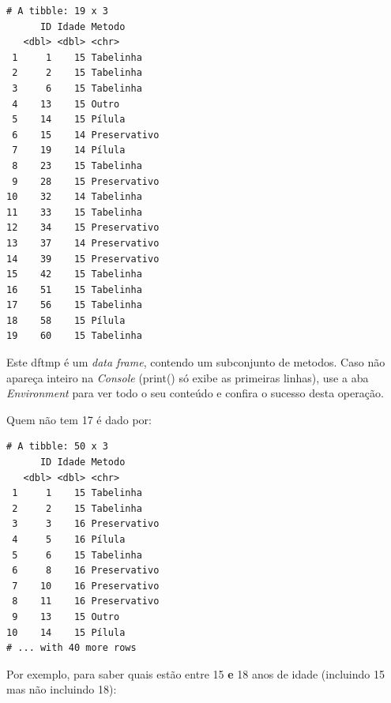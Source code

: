 \documentclass[
]{article}
\newenvironment{Shaded}{\begin{snugshade}}{\end{snugshade}}
\newcommand{\DecValTok}[1]{\textcolor[rgb]{0.00,0.00,0.81}{#1}}
\newcommand{\FunctionTok}[1]{\textcolor[rgb]{0.00,0.00,0.00}{#1}}
\newcommand{\NormalTok}[1]{#1}
\newcommand{\OtherTok}[1]{\textcolor[rgb]{0.56,0.35,0.01}{#1}}
\newcommand{\SpecialCharTok}[1]{\textcolor[rgb]{0.00,0.00,0.00}{#1}}
\begin{document}
\begin{verbatim}
# A tibble: 19 x 3
      ID Idade Metodo      
   <dbl> <dbl> <chr>       
 1     1    15 Tabelinha   
 2     2    15 Tabelinha   
 3     6    15 Tabelinha   
 4    13    15 Outro       
 5    14    15 Pílula      
 6    15    14 Preservativo
 7    19    14 Pílula      
 8    23    15 Tabelinha   
 9    28    15 Preservativo
10    32    14 Tabelinha   
11    33    15 Tabelinha   
12    34    15 Preservativo
13    37    14 Preservativo
14    39    15 Preservativo
15    42    15 Tabelinha   
16    51    15 Tabelinha   
17    56    15 Tabelinha   
18    58    15 Pílula      
19    60    15 Tabelinha   
\end{verbatim}

Este dftmp é um \emph{data frame}, contendo um subconjunto de metodos.
Caso não apareça inteiro na \emph{Console} (print() só exibe as
primeiras linhas), use a aba \emph{Environment} para ver todo o seu
conteúdo e confira o sucesso desta operação.

Quem não tem 17 é dado por:

\begin{Shaded}
\end{Shaded}

\begin{verbatim}
# A tibble: 50 x 3
      ID Idade Metodo      
   <dbl> <dbl> <chr>       
 1     1    15 Tabelinha   
 2     2    15 Tabelinha   
 3     3    16 Preservativo
 4     5    16 Pílula      
 5     6    15 Tabelinha   
 6     8    16 Preservativo
 7    10    16 Preservativo
 8    11    16 Preservativo
 9    13    15 Outro       
10    14    15 Pílula      
# ... with 40 more rows
\end{verbatim}

Por exemplo, para saber quais estão entre 15 \textbf{e} 18 anos de idade
(incluindo 15 mas não incluindo 18):

\begin{Shaded}
\end{Shaded}
\end{document}
